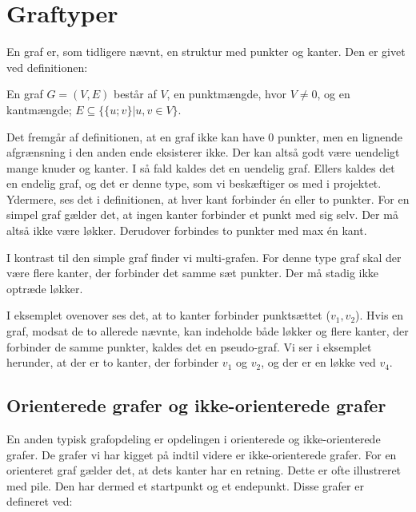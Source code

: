 \section{Graftyper}
En graf er, som tidligere nævnt, en struktur med punkter og kanter. Den er givet ved definitionen:
\begin{definition}
[Graf] 
En graf $G=(V,E)$ består af $V$, en punktmængde, hvor $V\neq0$, og en kantmængde; $E \subseteq \{\{u;v\}|u,v \in V\}$.
\end{definition}
Det fremgår af definitionen, at en graf ikke kan have 0 punkter, men en lignende afgrænsning i den anden ende eksisterer ikke. Der kan altså godt være uendeligt mange knuder og kanter. I så fald kaldes det en uendelig graf. Ellers kaldes det en endelig graf, og det er denne type, som vi beskæftiger os med i projektet.
Ydermere, ses det i definitionen, at hver kant forbinder én eller to punkter. For en simpel graf gælder det, at ingen kanter forbinder et punkt med sig selv. Der må altså ikke være løkker. Derudover forbindes to punkter med max én kant.



I kontrast til den simple graf finder vi multi-grafen. For denne type graf skal der være flere kanter, der forbinder det samme sæt punkter. Der må stadig ikke optræde løkker.



I eksemplet ovenover ses det, at to kanter forbinder punktsættet ($v_{1},v_{2}$). Hvis en graf, modsat de to allerede nævnte, kan indeholde både løkker og flere kanter, der forbinder de samme punkter, kaldes det en pseudo-graf. Vi ser i eksemplet herunder, at der er to kanter, der forbinder $v_{1}$ og $v_{2}$, og der er en løkke ved $v_{4}$.




\subsection{Orienterede grafer og ikke-orienterede grafer}
En anden typisk grafopdeling er opdelingen i orienterede og ikke-orienterede grafer. De grafer vi har kigget på indtil videre er ikke-orienterede grafer. For en orienteret graf gælder det, at dets kanter har en retning. Dette er ofte illustreret med pile. Den har dermed et startpunkt og et endepunkt. Disse grafer er defineret ved:

